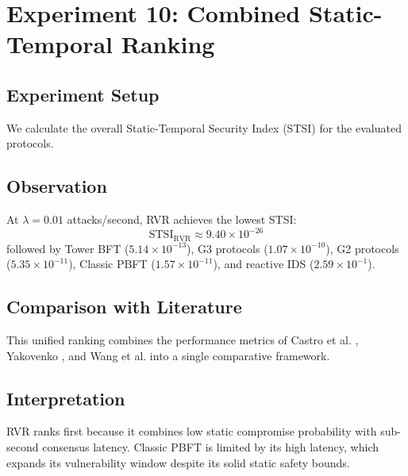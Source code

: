 \documentclass[12pt, oneside, a4paper]{report}
\theoremstyle{definition}
\theoremstyle{remark}
\begin{document}
\bigskip

\section{Experiment 10: Combined Static-Temporal Ranking}
\label{sec:res:e10}

\subsection{Experiment Setup}
We calculate the overall Static-Temporal Security Index (STSI) for the evaluated protocols.

\subsection{Observation}
At $\lambda = 0.01$ attacks/second, RVR achieves the lowest STSI:
\begin{equation}
\mathrm{STSI}_{\mathrm{RVR}} \approx 9.40 \times 10^{-26}
\end{equation}
followed by Tower BFT ($5.14 \times 10^{-13}$), G3 protocols ($1.07 \times 10^{-10}$), G2 protocols ($5.35 \times 10^{-11}$), Classic PBFT ($1.57 \times 10^{-11}$), and reactive IDS ($2.59 \times 10^{-1}$).

\subsection{Comparison with Literature}
This unified ranking combines the performance metrics of Castro et al. \cite{castro1999}, Yakovenko \cite{yakovenko2018}, and Wang et al. \cite{wang2025} into a single comparative framework.

\subsection{Interpretation}
RVR ranks first because it combines low static compromise probability with sub-second consensus latency. Classic PBFT is limited by its high latency, which expands its vulnerability window despite its solid static safety bounds.
\end{document}
